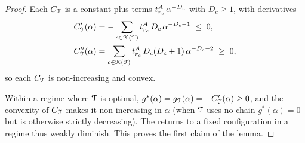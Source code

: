 \begin{proof}
Each $C_{\mathcal{T}}$ is a constant plus terms $t^{A}_{r_c}\,\alpha^{-D_c}$ with $D_c \ge 1$, with derivatives
\[
\begin{aligned}
C_{\mathcal{T}}'(\alpha) &= -\sum_{c \in \mathcal{K}(\mathcal{T})} t^{A}_{r_c}\,D_c\,\alpha^{-D_c-1} \;\le\; 0, \\
C_{\mathcal{T}}''(\alpha) &= \sum_{c \in \mathcal{K}(\mathcal{T})} t^{A}_{r_c}\,D_c(D_c+1)\,\alpha^{-D_c-2} \;\ge\; 0,
\end{aligned}
\]
so each $C_{\mathcal{T}}$ is non-increasing and convex.

Within a regime where $\mathcal{T}$ is optimal, $g^*(\alpha) = g_{\mathcal{T}}(\alpha) = -C_{\mathcal{T}}'(\alpha) \ge 0$, and the convexity of $C_{\mathcal{T}}$ makes it non-increasing in $\alpha$ (when $\mathcal{T}$ uses no chain $g^*(\alpha) = 0$ but is otherwise strictly decreasing).
The returns to a fixed configuration in a regime thus weakly diminish.
This proves the first claim of the lemma.


\end{proof}
